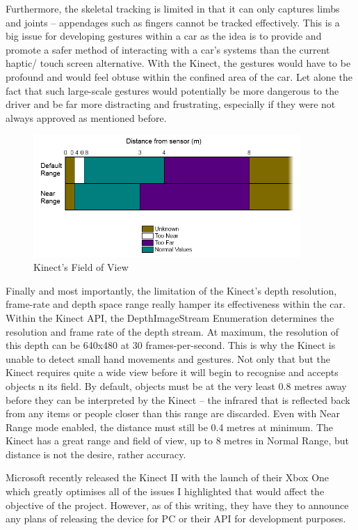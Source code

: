 \documentclass{l4proj}
\begin{document}
Furthermore, the skeletal tracking is limited in that it can only captures limbs and joints -- appendages such as fingers cannot be tracked effectively. This is a big issue for developing gestures within a car as the idea is to provide and promote a safer method of interacting with a car’s systems than the current haptic/ touch screen alternative. With the Kinect, the gestures would have to be profound and would feel obtuse within the confined area of the car. Let alone the fact that such large-scale gestures would potentially be more dangerous to the driver and be far more distracting and frustrating, especially if they  were not always approved as mentioned before.
\begin{figure}[h!]
\centering
\includegraphics[width=4in]{images/KinectDistance.png}
\caption{Kinect's Field of View}
\label{fig:view}
\end{figure}

Finally and most importantly, the limitation of the Kinect’s depth resolution, frame-rate and depth space range really hamper its effectiveness within the car. Within the Kinect API, the DepthImageStream  Enumeration determines the resolution and frame rate of the depth stream. At maximum, the resolution of this depth can be 640x480 at 30 frames-per-second. This is why the Kinect is unable to detect small hand movements and gestures. Not only that but the Kinect requires quite a wide view before it will begin to recognise and accepts objects n its field. By default, objects must be at the very least 0.8 metres away before they can be interpreted by the Kinect – the infrared that is reflected back from any items or people closer than this range are discarded. Even with  Near Range mode enabled, the distance must still be 0.4 metres at minimum. The Kinect has a great range and field of view, up to 8 metres in Normal Range, but distance is not the desire, rather accuracy.

Microsoft recently released the Kinect II with the launch of their Xbox One which greatly optimises all of the issues I highlighted that would affect the objective of the project. However, as of this writing, they have they to announce any plans of releasing the device for PC or their API for development purposes.   
\end{document}
